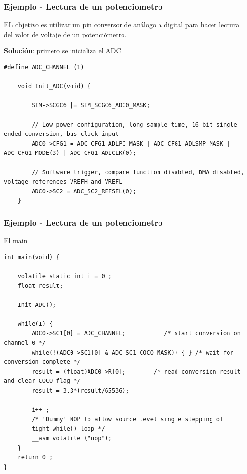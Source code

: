 \documentclass[10.5pt,scale=1.0,t,aspectratio=169,hyperref={pdfpagelabels=false}]{beamer}
\begin{document}
\begin{frame}[fragile]
	\frametitle{Ejemplo - Lectura de un potenciometro}
	{\small
		EL objetivo es utilizar un pin conversor de análogo a digital para hacer lectura del valor de voltaje de un potenciómetro. 
		
		\textbf{Solución}: primero se inicializa el ADC
\begin{lstlisting}[style=CStyle]
	#define ADC_CHANNEL (1)
	
	void Init_ADC(void) {
		
		SIM->SCGC6 |= SIM_SCGC6_ADC0_MASK;
		
		// Low power configuration, long sample time, 16 bit single-ended conversion, bus clock input
		ADC0->CFG1 = ADC_CFG1_ADLPC_MASK | ADC_CFG1_ADLSMP_MASK | ADC_CFG1_MODE(3) | ADC_CFG1_ADICLK(0);
		
		// Software trigger, compare function disabled, DMA disabled, voltage references VREFH and VREFL
		ADC0->SC2 = ADC_SC2_REFSEL(0);
	}
\end{lstlisting}		
		
	}
\end{frame}
\begin{frame}[fragile]
	\frametitle{Ejemplo - Lectura de un potenciometro}
	{\small
		El main
		\begin{lstlisting}[style=CStyle]
int main(void) {
	
	volatile static int i = 0 ;
	float result;
	
	Init_ADC();
	
	while(1) {
		ADC0->SC1[0] = ADC_CHANNEL;           /* start conversion on channel 0 */
		while(!(ADC0->SC1[0] & ADC_SC1_COCO_MASK)) { } /* wait for conversion complete */
		result = (float)ADC0->R[0];        /* read conversion result and clear COCO flag */
		result = 3.3*(result/65536);
		
		i++ ;
		/* 'Dummy' NOP to allow source level single stepping of
		tight while() loop */
		__asm volatile ("nop");
	}
	return 0 ;
}
		\end{lstlisting}		
		
	}
\end{frame}
\frame{
\begin{center}
	\LARGE \textcolor{blue}{INTERFAZ ANÁLOGA}
\end{center}

\begin{center}
	\LARGE \textcolor{blue}{GRACIAS}
\end{center}
}

\end{document}
